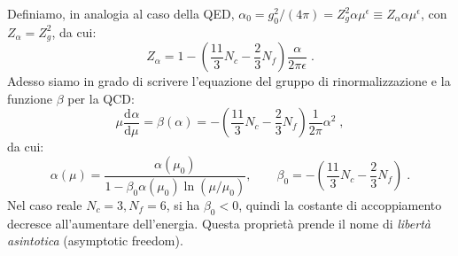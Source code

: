 \documentclass[12pt,a4paper]{article}
\theoremstyle{definition}
\newcommand{\dev}[3][]{\frac{\mathrm{d}^{#1} #2}{\mathrm{d} #3^{#1}}}
\numberwithin{equation}{section}
\begin{document}
Definiamo, in analogia al caso della QED, $\alpha_0=g_0^2/(4\pi)=Z_g^2\alpha\mu^{\epsilon}\equiv Z_{\alpha}\alpha\mu^{\epsilon}$, con $Z_{\alpha}=Z_g^2$, da cui:
\begin{equation}
Z_{\alpha}=1-\left(\frac{11}{3}N_c-\frac{2}{3}N_f\right)\frac{\alpha}{2\pi\epsilon}\;.
\end{equation}
Adesso siamo in grado di scrivere l'equazione del gruppo di rinormalizzazione e la funzione $\beta$ per la QCD:
\begin{equation}
\mu\dev{\alpha}{\mu}=\beta(\alpha)=-\left(\frac{11}{3}N_c-\frac{2}{3}N_f\right)\frac{1}{2\pi}\alpha^2\;,
\end{equation}
da cui:
\begin{equation}
\alpha(\mu)=\frac{\alpha(\mu_0)}{1-\beta_0\alpha(\mu_0)\ln(\mu/\mu_0)},\qquad \beta_0=-\left(\frac{11}{3}N_c-\frac{2}{3}N_f\right)\;.
\end{equation}
Nel caso reale $N_c=3,N_f=6$, si ha $\beta_0<0$, quindi la costante di accoppiamento decresce all'aumentare dell'energia. Questa proprietà prende il nome di \emph{libertà asintotica} (asymptotic freedom).
\cleardoublepage
\end{document}
